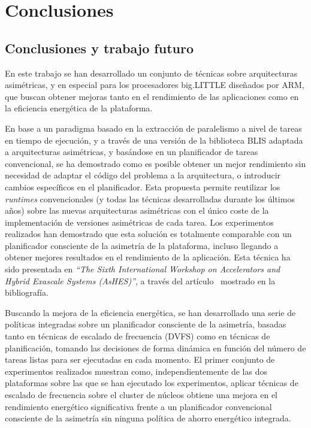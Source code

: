 \cleardoublepage

\chapter{Conclusiones}
\label{ch:chapter6}

\section{Conclusiones y trabajo futuro}

En este trabajo se han desarrollado un conjunto de técnicas sobre
arquitecturas asimétricas, y en especial para los procesadores big.LITTLE
diseñados por ARM, que buscan obtener mejoras tanto en el rendimiento de las
aplicaciones como en la eficiencia energética de la plataforma.

En base a un paradigma basado en la extracción de paralelismo a nivel de tareas
en tiempo de ejecución, y 
a través de una versión de la biblioteca BLIS adaptada a arquitecturas asimétricas, 
y basándose en un planificador de tareas convencional, se ha
demostrado como es posible obtener un mejor rendimiento sin necesidad de
adaptar el código del problema a la arquitectura, o introducir cambios
específicos en el planificador. Esta propuesta permite reutilizar los
\emph{runtimes} convencionales (y todas las técnicas desarrolladas durante
los últimos años) sobre las nuevas arquitecturas asimétricas con el único
coste de la implementación de versiones asimétricas de cada tarea.
Los experimentos realizados han demostrado que esta solución es
totalmente comparable con un planificador consciente de la asimetría de la
plataforma, incluso llegando a obtener mejores resultados en el rendimiento
de la aplicación. Esta técnica ha sido presentada en \emph{``The Sixth
  International Workshop on Accelerators and Hybrid Exascale Systems
  (AsHES)''}, a través del artículo~\cite{ashes} mostrado en la
bibliografía.

Buscando la mejora de la eficiencia energética, se han desarrollado una
serie de políticas integradas sobre un planificador consciente de la
asimetría, basadas tanto en técnicas de escalado de frecuencia (DVFS) como
en técnicas de planificación, tomando las decisiones de forma dinámica en
función del número de tareas listas para ser ejecutadas en cada momento. El
primer conjunto de experimentos realizados muestran como,
independientemente de las dos plataformas sobre las que se han ejecutado
los experimentos, aplicar técnicas de escalado de frecuencia sobre el
cluster de núcleos \BIG obtiene una mejora en el rendimiento energético
significativa frente a un planificador convencional consciente de la
asimetría sin ninguna política de ahorro energético integrada.

